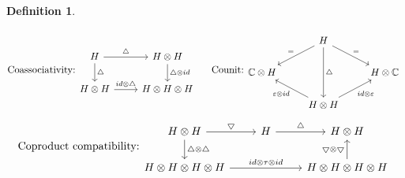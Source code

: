 \documentclass[12pt,a4paper]{article}
\newtheorem{definition}[theorem]{Definition}
\newcommand\1{_{(1)}}
\newcommand\2{_{(2)}}
\begin{document}
\begin{definition}
\[\begin{tikzcd}
\end{tikzcd}
\]
\[
\text{Coassociativity:} %
\begin{tikzcd}
H \arrow[r, "\triangle"] \arrow[d, "\triangle"] & H\otimes H \arrow[d, "\triangle\otimes id"] \\
H\otimes H \arrow[r, "id\otimes\triangle"]               & H\otimes H\otimes H                        
\end{tikzcd}
\text{\;\;\;\; Counit:}
\begin{tikzcd}
             & H \arrow[ld, "="'] \arrow[rd, "="] \arrow[dd, "\triangle"]                         &             \\
\mathbb{C}\otimes H &                                                                                    & H\otimes\mathbb{C} \\
             & H\otimes H \arrow[lu, "\varepsilon\otimes id"] \arrow[ru, "id\otimes\varepsilon"'] &            
\end{tikzcd}
\]
\[
\text{Coproduct compatibility:}
\begin{tikzcd}
H\otimes H \arrow[d, "\triangle\otimes\triangle"] \arrow[r, "\bigtriangledown"] & H \arrow[r, "\triangle"] & H\otimes H                                                                  \\
H\otimes H\otimes H\otimes H \arrow[rr, "id\otimes\tau\otimes id"]           &                          & H\otimes H\otimes H\otimes H \arrow[u, "\bigtriangledown\otimes\bigtriangledown"]
\end{tikzcd}
\]
\end{definition}
\end{document}
